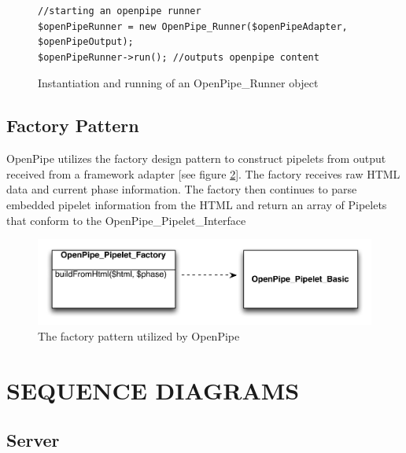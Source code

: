 \documentclass[12pt]{report}
\begin{document}
\begin{figure}[H]
\label{fig:strategyRunnerCode}
\begin{lstlisting}
//starting an openpipe runner
$openPipeRunner = new OpenPipe_Runner($openPipeAdapter, $openPipeOutput); 
$openPipeRunner->run(); //outputs openpipe content
\end{lstlisting}
\caption{Instantiation and running of an OpenPipe\_Runner object}
\end{figure}


\section{Factory Pattern}

OpenPipe utilizes the factory design pattern to construct pipelets from output received from a framework adapter [see figure \ref{fig:factoryPattern}]. The factory receives raw HTML data and current phase information. The factory then continues to parse embedded pipelet information from the HTML and return an array of Pipelets that conform to the OpenPipe\_Pipelet\_Interface 

\begin{figure}[H]
\label{fig:factoryPattern}
\centering
\includegraphics[width=\textwidth,keepaspectratio]{figures/images/factory_pipelets.pdf}
\caption{The factory pattern utilized by OpenPipe}
\end{figure}




\chapter{SEQUENCE DIAGRAMS}

\section{Server}
\end{document}
